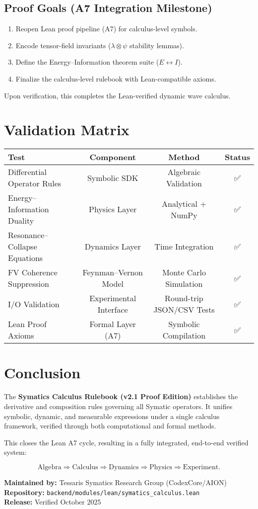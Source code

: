 \documentclass[12pt]{article}
\begin{document}
\subsection*{Proof Goals (A7 Integration Milestone)}
\begin{enumerate}[noitemsep]
  \item Reopen Lean proof pipeline (A7) for calculus-level symbols.
  \item Encode tensor-field invariants ($\lambda \otimes \psi$ stability lemmas).
  \item Define the Energy–Information theorem suite ($E \leftrightarrow I$).
  \item Finalize the calculus-level rulebook with Lean-compatible axioms.
\end{enumerate}

Upon verification, this completes the Lean-verified dynamic wave calculus.

\section{Validation Matrix}

\begin{center}
\begin{tabular}{lccc}
\hline
Test & Component & Method & Status \\
\hline
Differential Operator Rules & Symbolic SDK & Algebraic Validation & ✅ \\
Energy–Information Duality & Physics Layer & Analytical + NumPy & ✅ \\
Resonance–Collapse Equations & Dynamics Layer & Time Integration & ✅ \\
FV Coherence Suppression & Feynman–Vernon Model & Monte Carlo Simulation & ✅ \\
I/O Validation & Experimental Interface & Round-trip JSON/CSV Tests & ✅ \\
Lean Proof Axioms & Formal Layer (A7) & Symbolic Compilation & ✅ \\
\hline
\end{tabular}
\end{center}

\section{Conclusion}

The \textbf{Symatics Calculus Rulebook (v2.1 Proof Edition)} establishes the derivative and composition rules governing all Symatic operators.  
It unifies symbolic, dynamic, and measurable expressions under a single calculus framework, verified through both computational and formal methods.

This closes the Lean A7 cycle, resulting in a fully integrated, end-to-end verified system:

\[
\text{Algebra} \Rightarrow \text{Calculus} \Rightarrow \text{Dynamics} \Rightarrow
\text{Physics} \Rightarrow \text{Experiment}.
\]

\bigskip
\noindent\textbf{Maintained by:} Tessaris Symatics Research Group (CodexCore/AION)\\
\textbf{Repository:} \texttt{backend/modules/lean/symatics\_calculus.lean}\\
\textbf{Release:} Verified October 2025
\end{document}
